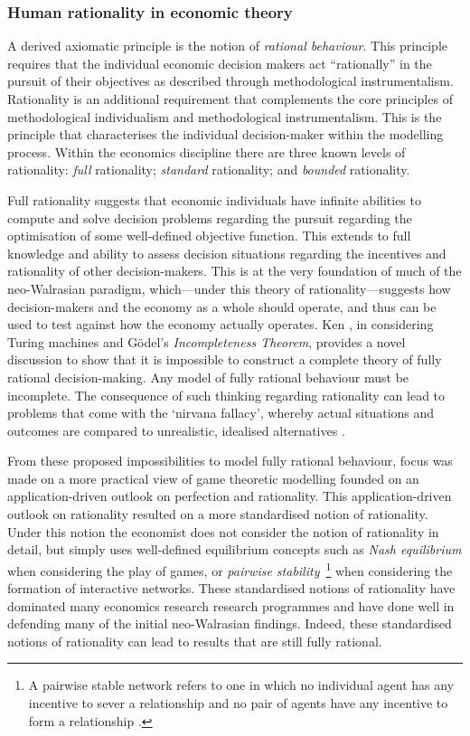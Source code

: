 \subsubsection{Human rationality in economic theory}

A derived axiomatic principle is the notion of \emph{rational behaviour}. This principle requires that the individual economic decision makers act ``rationally'' in the pursuit of their objectives as described through methodological instrumentalism. Rationality is an additional requirement that complements the core principles of methodological individualism and methodological instrumentalism. This is the principle that characterises the individual decision-maker within the modelling process. Within the economics discipline there are three known levels of rationality: \emph{full} rationality; \emph{standard} rationality; and \emph{bounded} rationality.

Full rationality suggests that economic individuals have infinite abilities to compute and solve decision problems regarding the pursuit regarding the optimisation of some well-defined objective function. This extends to full knowledge and ability to assess decision situations regarding the incentives and rationality of other decision-makers. This is at the very foundation of much of the neo-Walrasian paradigm, which---under this theory of rationality---suggests how decision-makers and the economy as a whole should operate, and thus can be used to test against how the economy actually operates. Ken \citet{Binmore1987a, Binmore1987b}, in considering Turing machines and G\"{o}del's \emph{Incompleteness Theorem}, provides a novel discussion to show that it is impossible to construct a complete theory of fully rational decision-making. Any model of fully rational behaviour must be incomplete. The consequence of such thinking regarding rationality can lead to problems that come with the `nirvana fallacy', whereby actual situations and outcomes are compared to unrealistic, idealised alternatives \citep{Demsetz1969}.

From these proposed impossibilities to model fully rational behaviour, focus was made on a more practical view of game theoretic modelling founded on an application-driven outlook on perfection and rationality. This application-driven outlook on rationality resulted on a more standardised notion of rationality. Under this notion the economist does not consider the notion of rationality in detail, but simply uses well-defined equilibrium concepts such as \emph{Nash equilibrium} \citep{Nash1951} when considering the play of games, or \emph{pairwise stability}~\footnote{A pairwise stable network refers to one in which no individual agent has any incentive to sever a relationship and no pair of agents have any incentive to form a relationship \citep{JacksonWolinsky1996, JacksonWatts2002WP}.} when considering the formation of interactive networks. These standardised notions of rationality have dominated many economics research research programmes and have done well in defending many of the initial neo-Walrasian findings. Indeed, these standardised notions of rationality can lead to results that are still fully rational.

